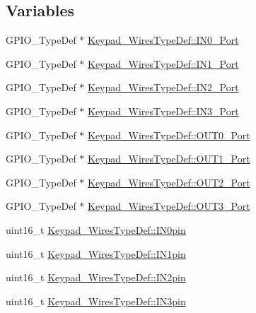 \subsection*{Variables}
\begin{DoxyCompactItemize}
\item 
G\+P\+I\+O\+\_\+\+Type\+Def $\ast$ \hyperlink{group___key_pad___functions_ga47955289b19390cde1cbc4c77f042369}{Keypad\+\_\+\+Wires\+Type\+Def\+::\+I\+N0\+\_\+\+Port}
\item 
G\+P\+I\+O\+\_\+\+Type\+Def $\ast$ \hyperlink{group___key_pad___functions_gacaa68d159d45a332a4932cd1b169d2ea}{Keypad\+\_\+\+Wires\+Type\+Def\+::\+I\+N1\+\_\+\+Port}
\item 
G\+P\+I\+O\+\_\+\+Type\+Def $\ast$ \hyperlink{group___key_pad___functions_ga29bcacbed0e3a0434a118a920050c682}{Keypad\+\_\+\+Wires\+Type\+Def\+::\+I\+N2\+\_\+\+Port}
\item 
G\+P\+I\+O\+\_\+\+Type\+Def $\ast$ \hyperlink{group___key_pad___functions_ga1c91503556cf87dd73d1372c64271ebc}{Keypad\+\_\+\+Wires\+Type\+Def\+::\+I\+N3\+\_\+\+Port}
\item 
G\+P\+I\+O\+\_\+\+Type\+Def $\ast$ \hyperlink{group___key_pad___functions_ga10de1d8c79b463b7fa695d5df589c427}{Keypad\+\_\+\+Wires\+Type\+Def\+::\+O\+U\+T0\+\_\+\+Port}
\item 
G\+P\+I\+O\+\_\+\+Type\+Def $\ast$ \hyperlink{group___key_pad___functions_ga5e0930dd209c2c8f460b318a19e1396f}{Keypad\+\_\+\+Wires\+Type\+Def\+::\+O\+U\+T1\+\_\+\+Port}
\item 
G\+P\+I\+O\+\_\+\+Type\+Def $\ast$ \hyperlink{group___key_pad___functions_gaa0c12d07fe7f540e10d5d31b268e9946}{Keypad\+\_\+\+Wires\+Type\+Def\+::\+O\+U\+T2\+\_\+\+Port}
\item 
G\+P\+I\+O\+\_\+\+Type\+Def $\ast$ \hyperlink{group___key_pad___functions_ga5032c6a39064da097f66706a20bed691}{Keypad\+\_\+\+Wires\+Type\+Def\+::\+O\+U\+T3\+\_\+\+Port}
\item 
uint16\+\_\+t \hyperlink{group___key_pad___functions_ga1982da4b510d015cde3d54a120d32461}{Keypad\+\_\+\+Wires\+Type\+Def\+::\+I\+N0pin}
\item 
uint16\+\_\+t \hyperlink{group___key_pad___functions_gad3d88b65475a470373eff3b7960853b8}{Keypad\+\_\+\+Wires\+Type\+Def\+::\+I\+N1pin}
\item 
uint16\+\_\+t \hyperlink{group___key_pad___functions_ga5091f76517c45ce696eac83b97dc9e44}{Keypad\+\_\+\+Wires\+Type\+Def\+::\+I\+N2pin}
\item 
uint16\+\_\+t \hyperlink{group___key_pad___functions_ga3a5097701246b81b3156baf4a6e3fb5e}{Keypad\+\_\+\+Wires\+Type\+Def\+::\+I\+N3pin}

\end{DoxyCompactItemize}
